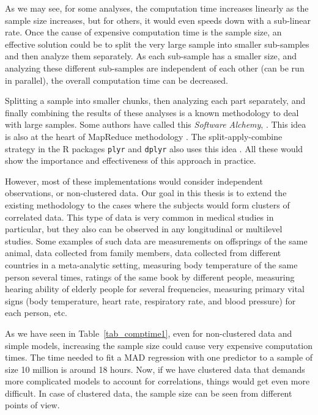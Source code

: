 \documentclass[11pt,a5paper,twoside]{book}
\begin{document}
As we may see, for some analyses, the computation time increases linearly as the sample size increases, but for others, it would even speeds down with a sub-linear rate. Once the cause of expensive computation time is the sample size, an effective solution could be to split the very large sample into smaller sub-samples and then analyze them separately. As each sub-sample has a smaller size, and analyzing these different sub-samples are independent of each other (can be run in parallel), the overall computation time can be decreased. 

Splitting a sample into smaller chunks, then analyzing each part separately, and finally combining the results of these analyses is a known methodology to deal with large samples. Some authors have called this \emph{Software Alchemy}, \cite{matloff2014}. This idea is also at the heart of MapReduce methodology \citep{dean2008}. The split-apply-combine strategy in the R packages {\tt{plyr}} and {\tt{dplyr}} also uses this idea \citep{wickham2011}. All these would show the importance and effectiveness of this approach in practice. 


However, most of these implementations would consider independent observations, or non-clustered data. Our goal in this thesis is to extend the existing methodology to the cases where the subjects would form clusters of correlated data. This type of data is very common in medical studies in particular, but they also can be observed in any longitudinal or multilevel studies. Some examples of such data are measurements on offsprings of the same animal, data collected from family members, data collected from different countries in a meta-analytic setting, measuring body temperature of the same person several times, ratings of the same book by different people, measuring hearing ability of elderly people for several frequencies, measuring primary vital signs (body temperature, heart rate, respiratory rate, and blood pressure) for each person, etc.

As we have seen in Table~\ref{tab_comptime1}, even for non-clustered data and simple models, increasing the sample size could cause very expensive computation times. The time needed to fit a MAD regression with one predictor to a sample of size 10 million is around 18 hours. Now, if we have clustered data that demands more complicated models to account for correlations, things would get even more difficult. In case of clustered data, the sample size can be seen from different points of view. 
\end{document}
